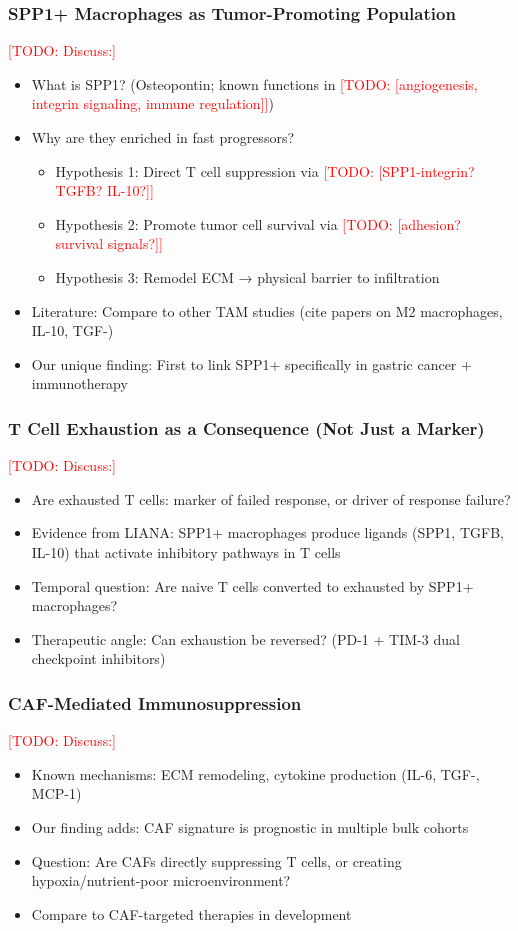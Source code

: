 \documentclass[12pt,oneside]{article}
\newcommand{\TODO}[1]{\textcolor{red}{[TODO: #1]}}
\begin{document}
\subsubsection*{SPP1+ Macrophages as Tumor-Promoting Population}
\TODO{Discuss:}
\begin{itemize}
    \item What is SPP1? (Osteopontin; known functions in \TODO{[angiogenesis, integrin signaling, immune regulation]})
    \item Why are they enriched in fast progressors?
    \begin{itemize}
        \item Hypothesis 1: Direct T cell suppression via \TODO{[SPP1-integrin? TGFB? IL-10?]}
        \item Hypothesis 2: Promote tumor cell survival via \TODO{[adhesion? survival signals?]}
        \item Hypothesis 3: Remodel ECM → physical barrier to infiltration
    \end{itemize}
    \item Literature: Compare to other TAM studies (cite papers on M2 macrophages, IL-10, TGF-\beta)
    \item Our unique finding: First to link SPP1+ specifically in gastric cancer + immunotherapy
\end{itemize}

\subsubsection*{T Cell Exhaustion as a Consequence (Not Just a Marker)}
\TODO{Discuss:}
\begin{itemize}
    \item Are exhausted T cells: marker of failed response, or driver of response failure?
    \item Evidence from LIANA: SPP1+ macrophages produce ligands (SPP1, TGFB, IL-10) that activate inhibitory pathways in T cells
    \item Temporal question: Are naive T cells converted to exhausted by SPP1+ macrophages?
    \item Therapeutic angle: Can exhaustion be reversed? (PD-1 + TIM-3 dual checkpoint inhibitors)
\end{itemize}

\subsubsection*{CAF-Mediated Immunosuppression}
\TODO{Discuss:}
\begin{itemize}
    \item Known mechanisms: ECM remodeling, cytokine production (IL-6, TGF-\beta, MCP-1)
    \item Our finding adds: CAF signature is prognostic in multiple bulk cohorts
    \item Question: Are CAFs directly suppressing T cells, or creating hypoxia/nutrient-poor microenvironment?
    \item Compare to CAF-targeted therapies in development
\end{itemize}
\end{document}
